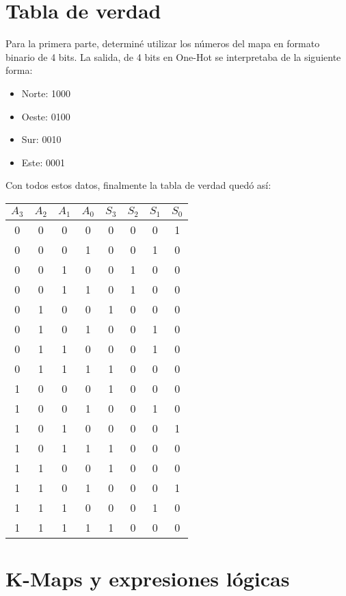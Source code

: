 \documentclass[a4paper,12pt]{article}
\begin{document}
\section{Tabla de verdad}
Para la primera parte, determiné utilizar los números del mapa en formato binario de 4 bits. La salida, de 4 bits en One-Hot se interpretaba de la siguiente forma:
\begin{itemize}
    \item Norte: 1000
    \item Oeste: 0100
    \item Sur: 0010
    \item Este: 0001
\end{itemize}
Con todos estos datos, finalmente la tabla de verdad quedó así:
\begin{center}
\begin{tabular}{c c c c | c c c c}
    $A_3$ & $A_2$ & $A_1$ & $A_0$ & $S_3$ & $S_2$ & $S_1$ & $S_0$\\
    \hline
    0 & 0 & 0 & 0 & 0 & 0 & 0 & 1\\
    0 & 0 & 0 & 1 & 0 & 0 & 1 & 0\\
    0 & 0 & 1 & 0 & 0 & 1 & 0 & 0\\
    0 & 0 & 1 & 1 & 0 & 1 & 0 & 0\\
    0 & 1 & 0 & 0 & 1 & 0 & 0 & 0\\
    0 & 1 & 0 & 1 & 0 & 0 & 1 & 0\\
    0 & 1 & 1 & 0 & 0 & 0 & 1 & 0\\
    0 & 1 & 1 & 1 & 1 & 0 & 0 & 0\\
    1 & 0 & 0 & 0 & 1 & 0 & 0 & 0\\
    1 & 0 & 0 & 1 & 0 & 0 & 1 & 0\\
    1 & 0 & 1 & 0 & 0 & 0 & 0 & 1\\
    1 & 0 & 1 & 1 & 1 & 0 & 0 & 0\\
    1 & 1 & 0 & 0 & 1 & 0 & 0 & 0\\
    1 & 1 & 0 & 1 & 0 & 0 & 0 & 1\\
    1 & 1 & 1 & 0 & 0 & 0 & 1 & 0\\
    1 & 1 & 1 & 1 & 1 & 0 & 0 & 0\\
\end{tabular}
\end{center}
\newpage
\section{K-Maps y expresiones lógicas}
\end{document}
